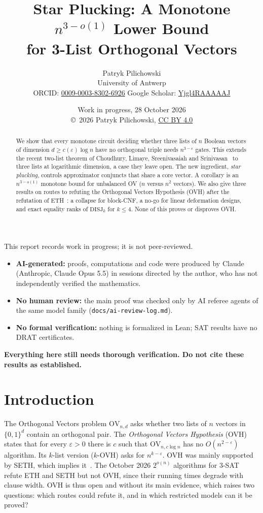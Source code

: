 \documentclass[11pt,a4paper]{article}
\title{\textbf{Star Plucking: A Monotone $n^{3-o(1)}$ Lower Bound\\for 3-List Orthogonal Vectors}}
\author{Patryk Pilichowski\\
\small University of Antwerp\\
\small ORCID: \href{https://orcid.org/0009-0003-8302-6926}{0009-0003-8302-6926}\quad
Google Scholar: \href{https://scholar.google.com/citations?user=Yjgl4RAAAAAJ}{Yjgl4RAAAAAJ}}
\date{Work in progress, 28 October 2026\\
\small\copyright\ 2026 Patryk Pilichowski, \href{https://creativecommons.org/licenses/by/4.0/}{CC BY 4.0}}
\theoremstyle{plain}
\theoremstyle{definition}
\theoremstyle{remark}
\newcommand{\OV}{\mathrm{OV}}
\newcommand{\DISJ}{\mathrm{DISJ}}
\newcommand{\code}[1]{\texttt{\small #1}}
\begin{document}
\maketitle

\begin{disclaimer}
\small
This report records work in progress; it is not peer-reviewed.
\begin{itemize}[leftmargin=12pt]
  \item \textbf{AI-generated:} proofs, computations and code were produced by Claude (Anthropic, Claude Opus 5.5)
    in sessions directed by the author, who has not independently verified the mathematics.
  \item \textbf{No human review:} the main proof was checked only by AI referee agents of the same model family
    (\code{docs/ai-review-log.md}).
  \item \textbf{No formal verification:} nothing is formalized in Lean; SAT results have no DRAT certificates.
\end{itemize}
\textbf{Everything here still needs thorough verification. Do not cite these results as established.}
\end{disclaimer}

\begin{abstract}
We show that every monotone circuit deciding whether three lists of $n$
Boolean vectors of dimension $d\ge c(\varepsilon)\log n$ have no orthogonal triple needs $n^{3-\varepsilon}$ gates. This
extends the recent two-list theorem of Choudhury, Limaye, Sreenivasaiah and Srinivasan~\cite{CLSS26} to three lists at
logarithmic dimension, a case they leave open. The new ingredient, \emph{star plucking}, controls
approximator conjuncts that share a core vector. A corollary is an $n^{3-o(1)}$ monotone bound for unbalanced OV
($n$ versus $n^2$ vectors). We also give three results on routes to refuting the Orthogonal Vectors Hypothesis (OVH)
after the refutation of ETH~\cite{OpenAI26,Anthropic26}: a collapse for block-CNF, a no-go for linear deformation
designs, and exact equality ranks of $\DISJ_k$ for $k\le4$. None of this proves or disproves OVH.
\end{abstract}

\section{Introduction}

The Orthogonal Vectors problem $\OV_{n,d}$ asks whether two lists of $n$ vectors in $\{0,1\}^d$ contain an orthogonal
pair. The \emph{Orthogonal Vectors Hypothesis} (OVH) states that for every $\varepsilon>0$ there is $c$ such that
$\OV_{n,c\log n}$ has no $O(n^{2-\varepsilon})$ algorithm. Its $k$-list version ($k$-OVH) asks for $n^{k-\varepsilon}$.
OVH was mainly supported by SETH, which implies it~\cite{Wil05}. The October 2026 $2^{o(n)}$ algorithms for
3-SAT~\cite{OpenAI26,Anthropic26} refute ETH and SETH but not OVH, since their running times degrade with clause
width. OVH is thus open and without its main evidence, which raises two questions: which routes could refute it, and
in which restricted models can it be proved?
\end{document}
